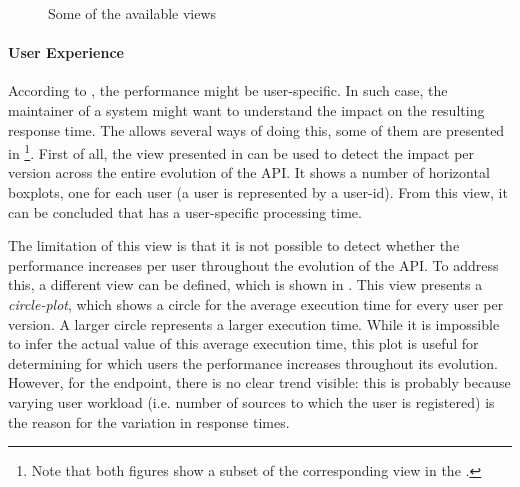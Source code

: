 \documentclass[conference]{IEEEtran}
\begin{document}
\begin{figure}[t]
	\centering
	\qquad
	\caption{Some of the available views\label{fig:user_experience}}
\end{figure}

\paragraph{User Experience}
\label{sec:user}
According to \cite{gmail}, the performance might be user-specific. In such case, the maintainer of a system might want to understand the impact on the resulting response time. The \tool allows several ways of doing this, some of them are presented in \footnote{Note that both figures show a subset of the corresponding view in the \tool.}. First of all, the view presented in  can be used to detect the impact per version across the entire evolution of the API. It shows a number of horizontal boxplots, one for each user (a user is represented by a user-id). From this view, it can be concluded that \epLearnedLanguage has a user-specific processing time. 

The limitation of this view is that it is not possible to detect whether the performance increases per user throughout the evolution of the API. To address this, a different view can be defined, which is shown in . This view presents a {\em circle-plot}, which shows a circle for the average execution time for every user per version. A larger circle represents a larger execution time. While it is impossible to infer the actual value of this average execution time, this plot is useful for determining for which users the performance increases throughout its evolution. However, for the \epLearnedLanguage endpoint, there is no clear trend visible: this is probably because varying user workload (i.e. number of sources to which the user is registered) is the reason for the variation in response times.
\end{document}
